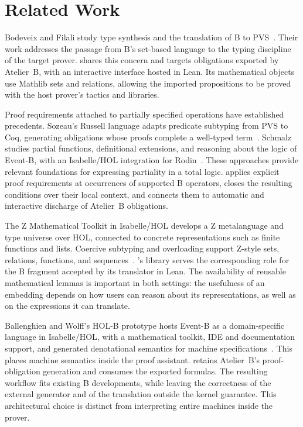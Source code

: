 \section{Related Work}
\label{sec:related}

Bodeveix and Filali study type synthesis and the translation of B to
PVS~\cite{Bodeveix2002BtoPVS}. Their work addresses the passage from B's
set-based language to the typing discipline of the target prover.
\barrel shares this concern and targets obligations exported by Atelier~B,
with an interactive interface hosted in Lean. Its mathematical objects
use Mathlib sets and relations, allowing the imported propositions to be
proved with the host prover's tactics and libraries.

Proof requirements attached to partially specified operations have
established precedents. Sozeau's Russell language adapts predicate
subtyping from PVS to Coq, generating obligations whose proofs complete
a well-typed term~\cite{Sozeau2007SubsetCoercions}. Schmalz studies
partial functions, definitional extensions, and reasoning about the
logic of Event-B, with an Isabelle/HOL integration for
Rodin~\cite{Schmalz2012RodinIsabelle}. These approaches provide relevant
foundations for expressing partiality in a total logic. \barrel applies
explicit proof requirements at occurrences of supported B operators,
closes the resulting conditions over their local context, and connects
them to automatic and interactive discharge of Atelier~B obligations.

The Z Mathematical Toolkit in Isabelle/HOL develops a Z metalanguage
and type universe over HOL, connected to concrete representations such
as finite functions and lists. Coercive subtyping and overloading support
Z-style sets, relations, functions, and sequences~\cite{Foster2025ZToolkit}.
\barrel's library serves the corresponding role for the B fragment
accepted by its translator in Lean. The availability of reusable
mathematical lemmas is important in both settings: the usefulness of
an embedding depends on how users can reason about its representations,
as well as on the expressions it can translate.

Ballenghien and Wolff's HOL-B prototype hosts Event-B as a domain-specific
language in Isabelle/HOL, with a mathematical toolkit, IDE and
documentation support, and generated denotational semantics for machine
specifications~\cite{Wolff2024EB_Isabelle}. This places machine semantics
inside the proof assistant. \barrel retains Atelier~B's proof-obligation
generation and consumes the exported formulas. The resulting workflow
fits existing B developments, while leaving the correctness of the
external generator and of the translation outside the kernel guarantee.
This architectural choice is distinct from interpreting entire machines
inside the prover.

